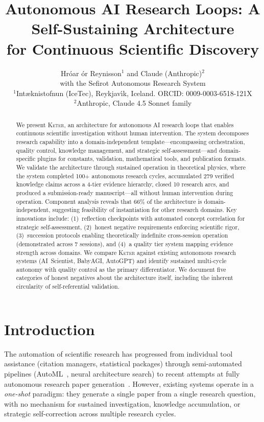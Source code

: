 \documentclass[11pt,a4paper]{article}
\title{Autonomous AI Research Loops: A Self-Sustaining Architecture\\for Continuous Scientific Discovery}
\author{
  Hr\'{o}ar {\TH}\'{o}r Reynisson$^{1}$ and Claude (Anthropic)$^{2}$ \\
  \small{with the Sefirot Autonomous Research System} \\[0.5em]
  \small $^{1}$I{\dh}nt{\ae}knistofnun (IceTec), Reykjav{\'\i}k, Iceland. ORCID: 0009-0003-6518-121X \\
  \small $^{2}$Anthropic, Claude 4.5 Sonnet family
}
\date{}
\newcommand{\keter}{\textsc{Keter}}
\begin{document}
\maketitle

\begin{abstract}
We present \keter{}, an architecture for autonomous AI research loops that enables
continuous scientific investigation without human intervention. The system decomposes
research capability into a domain-independent template---encompassing orchestration,
quality control, knowledge management, and strategic self-assessment---and
domain-specific plugins for constants, validation, mathematical tools, and publication
formats. We validate the architecture through sustained operation in theoretical
physics, where the system completed 100+ autonomous research cycles, accumulated
279 verified knowledge claims across a 4-tier evidence hierarchy, closed 10 research
arcs, and produced a submission-ready manuscript---all without human intervention
during operation. Component analysis reveals that 66\% of the architecture is
domain-independent, suggesting feasibility of instantiation for other research domains.
Key innovations include: (1)~reflection checkpoints with automated concept correlation
for strategic self-assessment, (2)~honest negative requirements enforcing scientific
rigor, (3)~succession protocols enabling theoretically indefinite cross-session
operation (demonstrated across 7 sessions), and
(4)~a quality tier system mapping evidence strength across domains. We compare \keter{}
against existing autonomous research systems (AI~Scientist, BabyAGI, AutoGPT) and
identify sustained multi-cycle autonomy with quality control as the primary
differentiator. We document five categories of honest negatives about the architecture
itself, including the inherent circularity of self-referential validation.
\end{abstract}

\section{Introduction}
\label{sec:intro}

The automation of scientific research has progressed from individual tool assistance
(citation managers, statistical packages) through semi-automated pipelines
(AutoML~\cite{automl}, neural architecture search) to recent attempts at fully
autonomous research paper generation~\cite{ai_scientist}. However, existing systems
operate in a \emph{one-shot} paradigm: they generate a single paper from a single
research question, with no mechanism for sustained investigation, knowledge
accumulation, or strategic self-correction across multiple research cycles.
\end{document}
